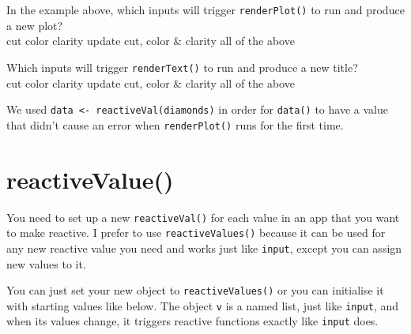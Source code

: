 \documentclass[
  oneside]{book}
\begin{document}
In the example above, which inputs will trigger \texttt{renderPlot}\texttt{()} to run and produce a new plot?\\
cut color clarity update cut, color \& clarity all of the above

Which inputs will trigger \texttt{renderText}\texttt{()} to run and produce a new title?\\
cut color clarity update cut, color \& clarity all of the above

\begin{info}
We used \texttt{data\ \textless{}-\ reactiveVal(diamonds)} in order for \texttt{data}\texttt{()} to have a value that didn't cause an error when \texttt{renderPlot}\texttt{()} runs for the first time.

\end{info}

\hypertarget{reactivevalue}{%
\section{reactiveValue()}\label{reactivevalue}}

You need to set up a new \texttt{reactiveVal}\texttt{()} for each value in an app that you want to make reactive. I prefer to use \texttt{reactiveValues}\texttt{()} because it can be used for any new reactive value you need and works just like \texttt{input}, except you can assign new values to it.

You can just set your new object to \texttt{reactiveValues}\texttt{()} or you can initialise it with starting values like below. The object \texttt{v} is a named list, just like \texttt{input}, and when its values change, it triggers reactive functions exactly like \texttt{input} does.
\end{document}
